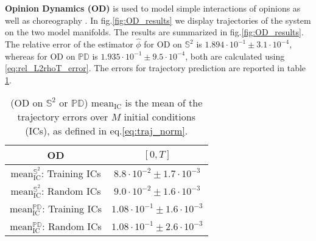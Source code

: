 \documentclass[11pt]{article}
\newcommand{\intkernel}{\phi}
\newcommand{\lintkernel}{\widehat{\intkernel}}
\begin{document}
\textbf{Opinion Dynamics (OD)} is used to model simple interactions of opinions \cite{OpinionDynamicsAylin2017, continuousOD} as well as choreography \cite{CLP2014}. 
In fig.\ref{fig:OD_results} we display trajectories of the system on the two model manifolds.
The results are summarized in fig.\ref{fig:OD_results}.
The relative error of the estimator $\lintkernel$ for OD on $\mathbb{S}^2$ is $1.894 \cdot 10^{-1} \pm 3.1 \cdot 10^{-4}$, whereas for OD on $\mathbb{PD}$ is $1.935 \cdot 10^{-1} \pm 9.5 \cdot 10^{-4}$, both are calculated using \eqref{eq:rel_L2rhoT_error}.
The errors for trajectory prediction are reported in table \ref{tab:traj_err}.
%
\begin{table}[H]
\vskip-1cm
\centering
\small{\begin{tabular}{| c || c |} 
\hline
        OD                                             & $[0, T]$                                \\
\hline
$\text{mean}_{\text{IC}}^{\mathbb{S}^2}$: Training ICs & $8.8 \cdot 10^{-2} \pm 1.7 \cdot 10^{-3}$ \\ 
\hline         
$\text{mean}_{\text{IC}}^{\mathbb{S}^2}$: Random ICs   & $9.0 \cdot 10^{-2} \pm 1.6 \cdot 10^{-3}$ \\
\hline   
\hline
$\text{mean}_{\text{IC}}^{\mathbb{PD}}$: Training ICs & $1.08 \cdot 10^{-1} \pm 1.6 \cdot 10^{-3}$ \\
\hline         
$\text{mean}_{\text{IC}}^{\mathbb{PD}}$: Random ICs   & $1.08 \cdot 10^{-1} \pm 2.6 \cdot 10^{-3}$ \\
\hline 
\end{tabular}}
\caption{(OD on $\mathbb{S}^2$ or $\mathbb{PD}$) $\text{mean}_{\text{IC}}$ is the mean of the trajectory errors over $M$ initial conditions (ICs), as defined in eq.\eqref{eq:traj_norm}.}
\label{tab:traj_err}
\end{table}
%
\end{document}
